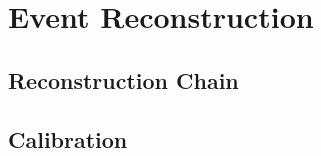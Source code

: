 \chapter{Event Reconstruction}
\label{ch:RecoCal}

\section{Reconstruction Chain}

\section{Calibration}
